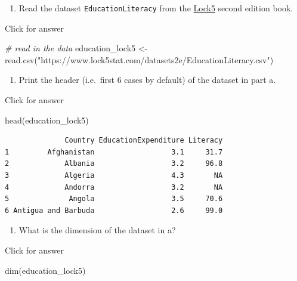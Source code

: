 \documentclass[
]{book}
\newenvironment{Shaded}{\begin{snugshade}}{\end{snugshade}}
\newcommand{\CommentTok}[1]{\textcolor[rgb]{0.56,0.35,0.01}{\textit{#1}}}
\newcommand{\FunctionTok}[1]{\textcolor[rgb]{0.00,0.00,0.00}{#1}}
\newcommand{\NormalTok}[1]{#1}
\newcommand{\OtherTok}[1]{\textcolor[rgb]{0.56,0.35,0.01}{#1}}
\newcommand{\StringTok}[1]{\textcolor[rgb]{0.31,0.60,0.02}{#1}}
\providecommand{\tightlist}{%
  \setlength{\itemsep}{0pt}\setlength{\parskip}{0pt}}
\begin{document}
\begin{enumerate}
\def\labelenumi{\alph{enumi}.}
\tightlist
\item
  Read the dataset \texttt{EducationLiteracy} from the \href{https://www.lock5stat.com/datapage2e.html}{Lock5} second edition book.
\end{enumerate}

Click for answer

\begin{Shaded}
\begin{Highlighting}[]
\CommentTok{\# read in the data}
\NormalTok{education\_lock5 }\OtherTok{\textless{}{-}} \FunctionTok{read.csv}\NormalTok{(}\StringTok{"https://www.lock5stat.com/datasets2e/EducationLiteracy.csv"}\NormalTok{)}
\end{Highlighting}
\end{Shaded}

\begin{enumerate}
\def\labelenumi{\alph{enumi}.}
\setcounter{enumi}{1}
\tightlist
\item
  Print the header (i.e.~first 6 cases by default) of the dataset in part a.
\end{enumerate}

Click for answer

\begin{Shaded}
\begin{Highlighting}[]
\FunctionTok{head}\NormalTok{(education\_lock5)}
\end{Highlighting}
\end{Shaded}

\begin{verbatim}
              Country EducationExpenditure Literacy
1         Afghanistan                  3.1     31.7
2             Albania                  3.2     96.8
3             Algeria                  4.3       NA
4             Andorra                  3.2       NA
5              Angola                  3.5     70.6
6 Antigua and Barbuda                  2.6     99.0
\end{verbatim}

\begin{enumerate}
\def\labelenumi{\alph{enumi}.}
\setcounter{enumi}{2}
\tightlist
\item
  What is the dimension of the dataset in a?
\end{enumerate}

Click for answer

\begin{Shaded}
\begin{Highlighting}[]
\FunctionTok{dim}\NormalTok{(education\_lock5)}
\end{Highlighting}
\end{Shaded}
\end{document}
